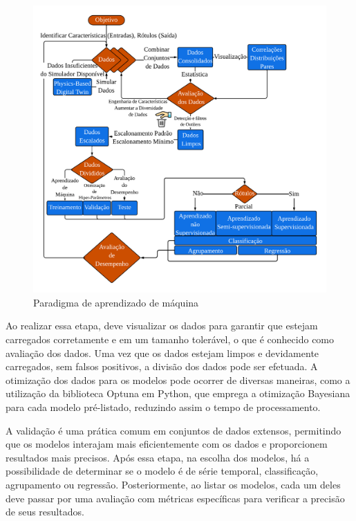 \begin{figure}[!htb]
	\centering
	\caption{Paradigma de aprendizado de máquina}
	\includegraphics[width=\linewidth]{Introducao/Figuras/paradigma-ml}
	
	\label{fig:paradigma-ml}
\end{figure}

Ao realizar essa etapa, deve visualizar os dados para garantir que estejam carregados corretamente e em um tamanho tolerável, o que é conhecido como avaliação dos dados. Uma vez que os dados estejam limpos e devidamente carregados, sem falsos positivos, a divisão dos dados pode ser efetuada.
A otimização dos dados para os modelos pode ocorrer de diversas maneiras, como a utilização da biblioteca Optuna em Python, que emprega a otimização Bayesiana para cada modelo pré-listado, reduzindo assim o tempo de processamento.

A validação é uma prática comum em conjuntos de dados extensos, permitindo que os modelos interajam mais eficientemente com os dados e proporcionem resultados mais precisos. Após essa etapa, na escolha dos modelos, há a possibilidade de determinar se o modelo é de série temporal, classificação, agrupamento ou regressão. Posteriormente, ao listar os modelos, cada um deles deve passar por uma avaliação com métricas específicas para verificar a precisão de seus resultados.


